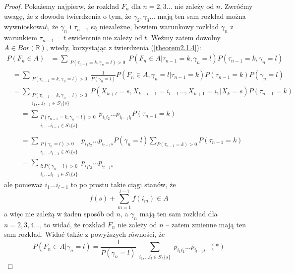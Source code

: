 \documentclass[a4paper]{article}
\theoremstyle{defn}
\theoremstyle{theorem}
\theoremstyle{lemma}
\theoremstyle{cor}
\theoremstyle{fact}
\begin{document}
\begin{proof}Pokażemy najpierw, że rozkład $F_n$ dla $n=2,3...$ nie zależy od $n$. Zwróćmy uwagę, że z dowodu twierdzenia o tym, że $\gamma_2, \gamma_3...$ mają ten sam rozkład można wywnioskować, że $\gamma_n$ i $\tau_{n-1}$ są niezależne, bowiem warunkowy rozkład $\gamma_n$ z warunkiem $\tau_{n-1} = t$ ewidentnie nie zależy od $t$. Weźmy zatem dowolny $A \in Bor(\mathbb{R})$, wtedy, korzystając z twierdzenia (\ref{theorem2.1.4}):
\begin{align*}
 P(F_n \in A) &= \sum\limits_{\substack{P(\tau_{n-1} = k, \gamma_{n} = l) > 0}} P(F_n \in A |\tau_{n-1} = k, \gamma_{n} = l)P(\tau_{n-1} = k, \gamma_{n} = l)
 \end{align*}
 \begin{align*}
 &=\sum\limits_{\substack{P(\tau_{n-1} = k, \gamma_{n} = l) > 0}} \frac{1}{P(\gamma_{n} = l)} P(F_n \in A, \gamma_{n} = l |\tau_{n-1} = k)P(\tau_{n-1} = k) P(\gamma_{n} = l)
 \end{align*}
 \begin{align*}
 &=\sum\limits_{\substack{P(\tau_{n-1} = k, \gamma_{n} = l) > 0\\i_1, ... i_{l-1} \in S\setminus \{s\}}} P(X_{k+l} = s, X_{k+l-1} = i_{l-1} ..., X_{k+1} = i_1|X_{k} = s)P(\tau_{n-1} = k)
 \end{align*}
 \begin{align*}
 &= \sum\limits_{\substack{P(\tau_{n-1} = k, \gamma_{n} = l) > 0\\i_1, ... i_{l-1} \in S\setminus \{s\}}} p_{i_1 i_2} ... p_{i_{l-1}i_l}P(\tau_{n-1} = k) \\\\
 &=\sum\limits_{\substack{P(\gamma_{n} = l) > 0\\i_1, ... i_{l-1} \in S\setminus \{s\}}} p_{i_1 i_2} ... p_{i_{l-1}s}P(\gamma_n = l) \sum\limits_{P(\tau_{n-1} = k) > 0} P(\tau_{n-1} = k)\\
 &= \sum\limits_{\substack{l: P(\gamma_{n} = l) > 0\\i_1, ... i_{l-1} \in S\setminus \{s\}}} p_{i_1 i_2} ... p_{i_{l-1}s}
\end{align*}
ale ponieważ $i_1 ... i_{l-1}$ to po prostu takie ciągi stanów, że $$f(s) + \sum\limits_{m = 1}^{l-1} f(i_m) \in A$$
a więc nie zależą w żaden sposób od $n$, a $\gamma_n$ mają ten sam rozkład dla $n=2,3,4...$, to widać, że rozkład $F_n$ nie zależy od $n$ – zatem zmienne mają ten sam rozkład. Widać także z powyższych równości, że $$P(F_n \in A|\gamma_n = l) = \frac{1}{P(\gamma_{n} = l)} \sum\limits_{\substack{i_1, ... i_{l} \in S \setminus \{s\} }} p_{i_1 i_2} ... p_{i_{l-1}s}\,\,\,(*)$$

\end{proof}
\end{document}
